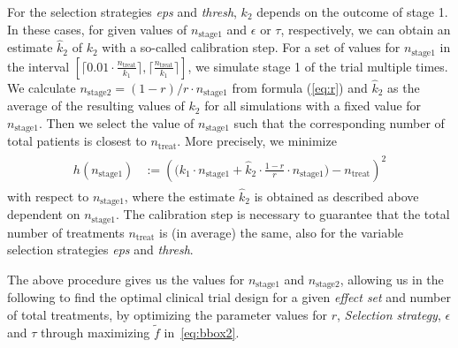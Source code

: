 \documentclass[bimj,fleqn]{w-art}
\theoremstyle{plain}
\theoremstyle{definition}
\begin{document}
For the selection strategies \emph{eps} and \emph{thresh}, $k_2$ depends on the outcome of stage 1.
In these cases, for given values of $n_{\text{stage1}}$ and $\epsilon$ or $\tau$, respectively, we can obtain an estimate $\hat{k}_2$ of $k_2$ with a so-called calibration step.
For a set of values for $n_{\text{stage1}}$ in the interval $\left[ \lceil 0.01 \cdot \frac{n_{\text{treat}}}{k_1} \rceil, \lceil \frac{n_{\text{treat}}}{k_1} \rceil \right]$, we simulate stage 1 of the trial multiple times.
We calculate $n_{\text{stage2}} = (1-r)/r\cdot n_{\text{stage1}}$ from formula (\ref{eq:r}) and $\hat{k}_2$ as the average of the resulting values of $k_2$ for all simulations with a fixed value for $n_{\text{stage1}}$.
Then we select the value of $n_{\text{stage1}}$ such that the corresponding number of total patients is closest to $n_{\text{treat}}$.
More precisely, we minimize
\begin{align}
  \label{eq:targettreat}
  \begin{split}
  h(n_{\text{stage1}}) &:= \left( \Big(k_1 \cdot n_{\text{stage1}} + \hat{k}_2 \cdot %
  \frac{1-r}{r} \cdot n_{\text{stage1}}
  \Big) - n_{\text{treat}} \right)^2
  \end{split}
\end{align}
with respect to $n_{\text{stage1}}$, where the estimate $\hat{k}_2$ is obtained as described above dependent on $n_{\text{stage1}}$. 
The calibration step is necessary to guarantee that the total number of treatments $n_{\text{treat}}$ is (in average) the same, also for the variable selection strategies \emph{eps} and \emph{thresh}.

The above procedure gives us the values for $n_{\text{stage1}}$ and $n_{\text{stage2}}$, allowing us in the following to find the optimal clinical trial design for a given \emph{effect set} and number of total treatments, by optimizing the parameter values for $r$, \emph{Selection strategy}, $\epsilon$ and $\tau$ through maximizing $\tilde f$ in~\ref{eq:bbox2}.
\end{document}
